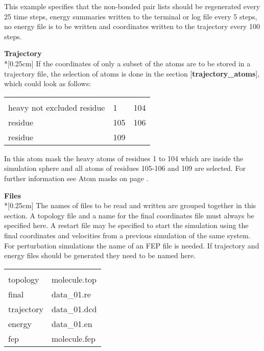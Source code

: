 \documentclass[a4paper,11pt]{article}
\begin{document}
This example specifies that the non-bonded pair lists should be
regenerated every 25 time steps, energy summaries written to the
terminal or log file every 5 steps, no energy file is to be
written and coordinates written to the trajectory every 100 steps.

\textbf{Trajectory}\\*[0.25cm] If the coordinates of only a subset
of the atoms are to be stored in a trajectory file, the selection
of atoms is done in the section [\textbf{trajectory{\_}atoms}],
which could look as follows:

\begin{center}
\begin{tabularx}{\textwidth}{|l l X|}
  \hline
  [trajectory{\_}atoms]      & & \\
  heavy not excluded residue & 1 & 104 \\
  residue                    & 105 & 106 \\
  residue                    & 109 & \\ \hline
\end{tabularx}
\end{center}

In this atom mask the heavy atoms of residues 1 to 104 which are
inside the simulation sphere and all atoms of residues 105-106 and
109 are selected. For further information see Atom masks on page
\pageref{subsubsec:atom_masks}.

\textbf{Files}\\*[0.25cm] The names of files to be read and
written are grouped together in this section. A topology file and
a name for the final coordinates file must always be specified
here. A restart file may be specified to start the simulation
using the final coordinates and velocities from a previous
simulation of the same system. For perturbation simulations the
name of an FEP file is needed. If trajectory and energy files
should be generated they need to be named here.

\begin{center}
\begin{tabularx}{\textwidth}{|l X|}
  \hline
  [files]    & \\
  topology   & molecule.top \\
  final      & data{\_}01.re \\
  trajectory & data{\_}01.dcd \\
  energy     & data{\_}01.en \\
  fep        & molecule.fep \\ \hline
\end{tabularx}
\end{center}
\end{document}
